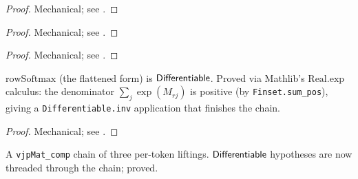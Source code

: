 \begin{theorem}
  \label{thm:layerNorm_per_token_has_vjp_mat}
  \leanok
\end{theorem}

\begin{proof}
\leanok
Mechanical; see .
\end{proof}

\begin{theorem}
  \label{thm:dense_per_token_has_vjp_mat}
  \leanok
\end{theorem}

\begin{proof}
\leanok
Mechanical; see .
\end{proof}

\begin{theorem}
  \label{thm:gelu_per_token_has_vjp_mat}
  \leanok
\end{theorem}

\begin{proof}
\leanok
Mechanical; see .
\end{proof}

\begin{theorem}
  \label{ax:rowSoftmax_flat_diff}
  \leanok
  \(\mathrm{rowSoftmax}\) (the flattened form) is \(\mathsf{Differentiable}\).
  Proved via Mathlib's \(\mathrm{Real.exp}\) calculus: the denominator
  \(\sum_j \exp(M_{rj})\) is positive (by \texttt{Finset.sum\_pos}),
  giving a \texttt{Differentiable.inv} application that finishes the
  chain.
\end{theorem}

\begin{proof}
\leanok
Mechanical; see .
\end{proof}

\begin{theorem}
  \label{thm:transformerMlp_has_vjp_mat}
  \leanok
  A \texttt{vjpMat\_comp} chain of three per-token liftings.
  \(\mathsf{Differentiable}\) hypotheses are now threaded through the chain;
  proved.
\end{theorem}

